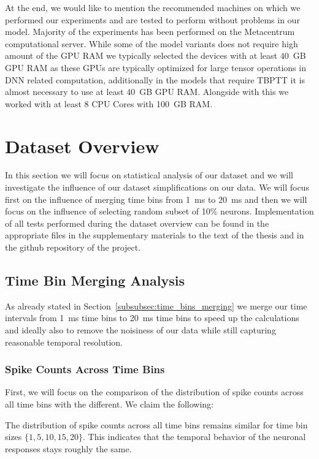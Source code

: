 At the end, we would like to mention the recommended machines on which we performed our experiments and are tested to perform without problems in our model. Majority of the experiments has been performed on the Metacentrum computational server. While some of the model variants does not require high amount of the GPU RAM we typically selected the devices with at least 40~GB GPU RAM as these GPUs are typically optimized for large tensor operations in DNN related computation, additionally in the models that require TBPTT it is almost necessary to use at least 40~GB GPU RAM. Alongside with this we worked with at least 8 CPU Cores with 100~GB RAM.

\section{Dataset Overview}
\label{sec:dataset_overview}

In this section we will focus on statistical analysis of our dataset and we will investigate the influence of our dataset simplifications on our data. We will focus first on the influence of merging time bins from 1~ms to 20~ms and then we will focus on the influence of selecting random subset of 10\% neurons. Implementation of all tests performed during the dataset overview can be found in the appropriate files in the supplementary materials to the text of the thesis and in the github repository of the project.

\subsection{Time Bin Merging Analysis}
\label{subsec:time_bin_merging_analysis}
As already stated in Section~\ref{subsubsec:time_bins_merging} we merge our time intervals from 1~ms time bins to 20~ms time bins to speed up the calculations and ideally also to remove the noisiness of our data while still capturing reasonable temporal resolution.

\subsubsection{Spike Counts Across Time Bins}
\label{subsubsec:spike_counts_time_bins}

First, we will focus on the comparison of the distribution of spike counts across all time bins with the different. We claim the following:

\begin{claim}
    The distribution of spike counts across all time bins remains similar for time bin sizes $\{1, 5, 10, 15, 20\}$. This indicates that the temporal behavior of the neuronal responses stays roughly the same.
\end{claim}
\label{claim:tim_bin_counts}


